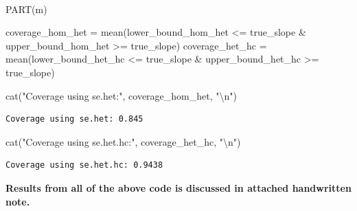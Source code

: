 \documentclass[
  11pt,
]{article}
\makeatletter
\let\oldparagraph\paragraph
\renewcommand{\paragraph}{
    \@ifstar
      \xxxParagraphStar
      \xxxParagraphNoStar
  }
\newcommand{\xxxParagraphStar}[1]{\oldparagraph*{#1}\mbox{}}
\newcommand{\xxxParagraphNoStar}[1]{\oldparagraph{#1}\mbox{}}
\newenvironment{Shaded}{\begin{snugshade}}{\end{snugshade}}
\newcommand{\FunctionTok}[1]{\textcolor[rgb]{0.28,0.35,0.67}{#1}}
\newcommand{\NormalTok}[1]{\textcolor[rgb]{0.00,0.23,0.31}{#1}}
\newcommand{\OtherTok}[1]{\textcolor[rgb]{0.00,0.23,0.31}{#1}}
\newcommand{\SpecialCharTok}[1]{\textcolor[rgb]{0.37,0.37,0.37}{#1}}
\newcommand{\StringTok}[1]{\textcolor[rgb]{0.13,0.47,0.30}{#1}}
\makeatother
\begin{document}
\paragraph{PART(m)}\label{partm}

\begin{Shaded}
\begin{Highlighting}[]
\NormalTok{coverage\_hom\_het }\OtherTok{=} \FunctionTok{mean}\NormalTok{(lower\_bound\_hom\_het }\SpecialCharTok{\textless{}=}\NormalTok{ true\_slope }\SpecialCharTok{\&} 
\NormalTok{                          upper\_bound\_hom\_het }\SpecialCharTok{\textgreater{}=}\NormalTok{ true\_slope)}
\NormalTok{coverage\_het\_hc }\OtherTok{=} \FunctionTok{mean}\NormalTok{(lower\_bound\_het\_hc }\SpecialCharTok{\textless{}=}\NormalTok{ true\_slope }\SpecialCharTok{\&} 
\NormalTok{                         upper\_bound\_het\_hc }\SpecialCharTok{\textgreater{}=}\NormalTok{ true\_slope)}

\FunctionTok{cat}\NormalTok{(}\StringTok{"Coverage using se.het:"}\NormalTok{, coverage\_hom\_het, }\StringTok{"}\SpecialCharTok{\textbackslash{}n}\StringTok{"}\NormalTok{)}
\end{Highlighting}
\end{Shaded}

\begin{verbatim}
Coverage using se.het: 0.845 
\end{verbatim}

\begin{Shaded}
\begin{Highlighting}[]
\FunctionTok{cat}\NormalTok{(}\StringTok{"Coverage using se.het.hc:"}\NormalTok{, coverage\_het\_hc, }\StringTok{"}\SpecialCharTok{\textbackslash{}n}\StringTok{"}\NormalTok{)}
\end{Highlighting}
\end{Shaded}

\begin{verbatim}
Coverage using se.het.hc: 0.9438 
\end{verbatim}

\textbf{Results from all of the above code is discussed in attached
handwritten note.}
\end{document}
